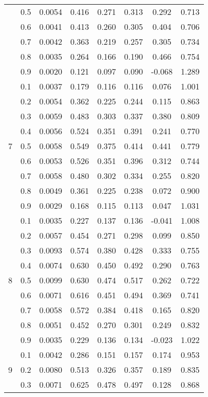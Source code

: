 \documentclass[11pt,a4paper]{report}
\begin{document}
\begin{longtable}{ | c | c || c | c | c | c | c | c | }
 & 0.5 & 0.0054 & 0.416 & 0.271 & 0.313 & 0.292 & 0.713 \\
 & 0.6 & 0.0041 & 0.413 & 0.260 & 0.305 & 0.404 & 0.706 \\
 & 0.7 & 0.0042 & 0.363 & 0.219 & 0.257 & 0.305 & 0.734 \\
 & 0.8 & 0.0035 & 0.264 & 0.166 & 0.190 & 0.466 & 0.754 \\
 & 0.9 & 0.0020 & 0.121 & 0.097 & 0.090 & -0.068 & 1.289 \\
 \hline
\multirow{9}{*}{7} & 0.1 & 0.0037 & 0.179 & 0.116 & 0.116 & 0.076 & 1.001 \\
 & 0.2 & 0.0054 & 0.362 & 0.225 & 0.244 & 0.115 & 0.863 \\
 & 0.3 & 0.0059 & 0.483 & 0.303 & 0.337 & 0.380 & 0.809 \\
 & 0.4 & 0.0056 & 0.524 & 0.351 & 0.391 & 0.241 & 0.770 \\
 & 0.5 & 0.0058 & 0.549 & 0.375 & 0.414 & 0.441 & 0.779 \\
 & 0.6 & 0.0053 & 0.526 & 0.351 & 0.396 & 0.312 & 0.744 \\
 & 0.7 & 0.0058 & 0.480 & 0.302 & 0.334 & 0.255 & 0.820 \\
 & 0.8 & 0.0049 & 0.361 & 0.225 & 0.238 & 0.072 & 0.900 \\
 & 0.9 & 0.0029 & 0.168 & 0.115 & 0.113 & 0.047 & 1.031 \\
 \hline
\multirow{9}{*}{8} & 0.1 & 0.0035 & 0.227 & 0.137 & 0.136 & -0.041 & 1.008 \\
 & 0.2 & 0.0057 & 0.454 & 0.271 & 0.298 & 0.099 & 0.850 \\
 & 0.3 & 0.0093 & 0.574 & 0.380 & 0.428 & 0.333 & 0.755 \\
 & 0.4 & 0.0074 & 0.630 & 0.450 & 0.492 & 0.290 & 0.763 \\
 & 0.5 & 0.0099 & 0.630 & 0.474 & 0.517 & 0.262 & 0.722 \\
 & 0.6 & 0.0071 & 0.616 & 0.451 & 0.494 & 0.369 & 0.741 \\
 & 0.7 & 0.0058 & 0.572 & 0.384 & 0.418 & 0.165 & 0.820 \\
 & 0.8 & 0.0051 & 0.452 & 0.270 & 0.301 & 0.249 & 0.832 \\
 & 0.9 & 0.0035 & 0.229 & 0.136 & 0.134 & -0.023 & 1.022 \\
 \hline
\multirow{9}{*}{9} & 0.1 & 0.0042 & 0.286 & 0.151 & 0.157 & 0.174 & 0.953 \\
 & 0.2 & 0.0080 & 0.513 & 0.326 & 0.357 & 0.189 & 0.835 \\
 & 0.3 & 0.0071 & 0.625 & 0.478 & 0.497 & 0.128 & 0.868 \\

\end{longtable}
\end{document}
